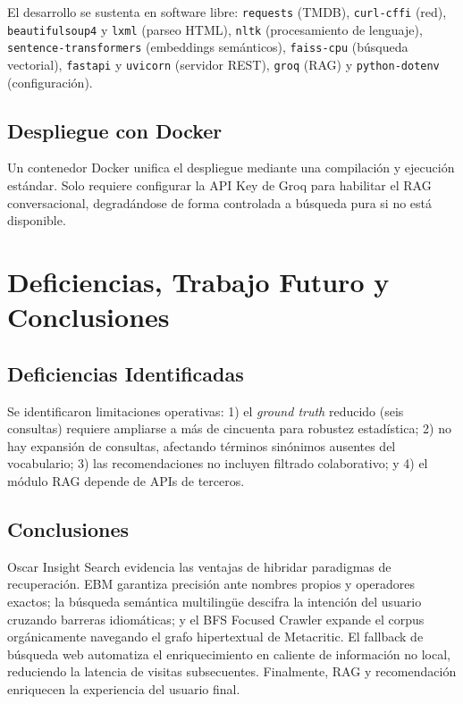 \documentclass[10pt,a4paper]{llncs}
\begin{document}
El desarrollo se sustenta en software libre: \texttt{requests} (TMDB), \texttt{curl-cffi} (red), \texttt{beautifulsoup4} y \texttt{lxml} (parseo HTML), \texttt{nltk} (procesamiento de lenguaje), \texttt{sentence-transformers} (embeddings semánticos), \texttt{faiss-cpu} (búsqueda vectorial), \texttt{fastapi} y \texttt{uvicorn} (servidor REST), \texttt{groq} (RAG) y \texttt{python-dotenv} (configuración).

\subsection{Despliegue con Docker}

Un contenedor Docker unifica el despliegue mediante una compilación y ejecución estándar. Solo requiere configurar la API Key de Groq para habilitar el RAG conversacional, degradándose de forma controlada a búsqueda pura si no está disponible.

\section{Deficiencias, Trabajo Futuro y Conclusiones}

\subsection{Deficiencias Identificadas}

Se identificaron limitaciones operativas: 1) el \textit{ground truth} reducido (seis consultas) requiere ampliarse a más de cincuenta para robustez estadística; 2) no hay expansión de consultas, afectando términos sinónimos ausentes del vocabulario; 3) las recomendaciones no incluyen filtrado colaborativo; y 4) el módulo RAG depende de APIs de terceros.

\subsection{Conclusiones}

Oscar Insight Search evidencia las ventajas de hibridar paradigmas de recuperación. EBM garantiza precisión ante nombres propios y operadores exactos; la búsqueda semántica multilingüe descifra la intención del usuario cruzando barreras idiomáticas; y el BFS Focused Crawler expande el corpus orgánicamente navegando el grafo hipertextual de Metacritic. El fallback de búsqueda web automatiza el enriquecimiento en caliente de información no local, reduciendo la latencia de visitas subsecuentes. Finalmente, RAG y recomendación enriquecen la experiencia del usuario final.
\end{document}
